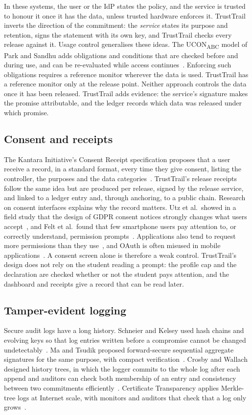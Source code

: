 In these systems, the user or the IdP states the policy, and the service is trusted to honour it once it has the data, unless trusted hardware enforces it. TrustTrail inverts the direction of the commitment: the \emph{service} states its purpose and retention, signs the statement with its own key, and TrustTrail checks every release against it. Usage control generalises these ideas. The UCON\textsubscript{ABC} model of Park and Sandhu adds obligations and conditions that are checked before and during use, and can be re-evaluated while access continues~\cite{park2004ucon}. Enforcing such obligations requires a reference monitor wherever the data is used. TrustTrail has a reference monitor only at the release point. Neither approach controls the data once it has been released. TrustTrail adds evidence: the service's signature makes the promise attributable, and the ledger records which data was released under which promise.

\subsection{Consent and receipts}
The Kantara Initiative's Consent Receipt specification proposes that a user receive a record, in a standard format, every time they give consent, listing the controller, the purposes and the data categories~\cite{kantarareceipt}. TrustTrail's release receipts follow the same idea but are produced per release, signed by the release service, and linked to a ledger entry and, through anchoring, to a public chain. Research on consent interfaces explains why the record matters. Utz et al.\ showed in a field study that the design of GDPR consent notices strongly changes what users accept~\cite{utz2019uninformed}, and Felt et al.\ found that few smartphone users pay attention to, or correctly understand, permission prompts~\cite{felt2012attention}. Applications also tend to request more permissions than they use~\cite{felt2011permissions}, and OAuth is often misused in mobile applications~\cite{chen2014oauth}. A consent screen alone is therefore a weak control. TrustTrail's design does not rely on the student reading a prompt: the profile cap and the declaration are checked whether or not the student pays attention, and the dashboard and receipts give a record that can be read later.

\subsection{Tamper-evident logging}
Secure audit logs have a long history. Schneier and Kelsey used hash chains and evolving keys so that log entries written before a compromise cannot be changed undetectably~\cite{schneier1999secure}. Ma and Tsudik proposed forward-secure sequential aggregate signatures for the same purpose, with compact verification~\cite{ma2007forward}. Crosby and Wallach designed history trees, in which the logger commits to the whole log after each append and auditors can check both membership of an entry and consistency between two commitments efficiently~\cite{crosby2009efficient}. Certificate Transparency applies Merkle-tree logs at Internet scale, with monitors and auditors that check that a log only grows~\cite{laurie2014certificate,rfc6962,rfc9162}.

